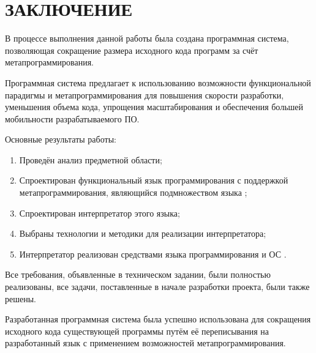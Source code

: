 \section*{ЗАКЛЮЧЕНИЕ}

В процессе выполнения данной работы была создана программная система, позволяющая сокращение размера исходного кода программ за счёт метапрограммирования.

Программная система предлагает к использованию возможности функциональной парадигмы и метапрограммирования для повышения скорости разработки, уменьшения объема кода, упрощения масштабирования и обеспечения большей мобильности разрабатываемого ПО.

Основные результаты работы:
\begin{enumerate}
	\item Проведён анализ предметной области;
	\item Спроектирован функциональный язык программирования с поддержкой метапрограммирования, являющийся подмножеством языка ;
	\item Спроектирован интерпретатор этого языка;
	\item Выбраны технологии и методики для реализации интерпретатора;
	\item Интерпретатор реализован средствами языка программирования  и ОС .
\end{enumerate}


Все требования, объявленные в техническом задании, были полностью реализованы, все задачи, поставленные в начале разработки проекта, были также решены.

Разработанная программная система была успешно использована для сокращения исходного кода существующей программы путём её переписывания на разработанный язык с применением возможностей метапрограммирования.